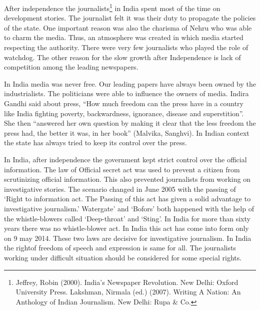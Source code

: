 \begin{multicols}{2}

\noi
After independence the journalists\footnote{Jeffrey, Robin (2000). India’s Newspaper Revolution. New Delhi: Oxford University Press. Lakshman, Nirmala (ed.) (2007). Writing A Nation: An Anthology of Indian Journalism. New Delhi: Rupa \& Co.} in India spent most of the time on development stories.
The journalist felt it was their duty to propagate the policies of the state. One important reason was also the charisma of Nehru who was able to charm the media. Thus, an atmosphere was
created in which media started respecting the authority. There were very few journalists who
played the role of watchdog. The other reason for the slow growth after Independence is lack
of competition among the leading newspapers.




\noi
In India media was never free. Our leading papers have always been owned by the
industrialists. The politicians were able to influence the owners of media. Indira Gandhi said
about press, “How much freedom can the press have in a country like India fighting poverty,
backwardness, ignorance, disease and superstition”. She then “answered her own question by
making it clear that the less freedom the press had, the better it was, in her book” (Malvika,
Sanghvi). In Indian context the state has always tried to keep its control over the press.




\noi
In India, after independence the government kept strict control over the official information.
The law of Official secret act was used to prevent a citizen from scrutinizing official
information. This also prevented journalists from working on investigative stories. The
scenario changed in June 2005 with the passing of ‘Right to information act. The Passing of
this act has given a solid advantage to investigative journalism.’ Watergate’ and ‘Bofors’ both
happened with the help of the whistle-blowers called ‘Deep-throat’ and ‘Sting’. In India for
more than sixty years there was no whistle-blower act. In India this act has come into form only
on 9 may 2014. These two laws are decisive for investigative journalism. In India the rightof
freedom of speech and expression is same for all. The journalists working under difficult
situation should be considered for some special rights.


\end{multicols}
